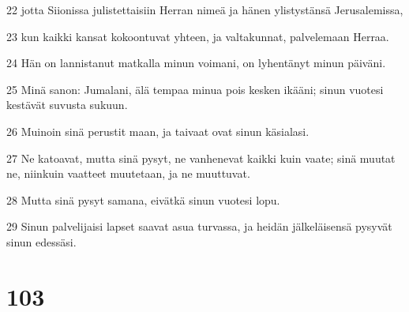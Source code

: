 \par 22 jotta Siionissa julistettaisiin Herran nimeä ja hänen ylistystänsä Jerusalemissa,
\par 23 kun kaikki kansat kokoontuvat yhteen, ja valtakunnat, palvelemaan Herraa.
\par 24 Hän on lannistanut matkalla minun voimani, on lyhentänyt minun päiväni.
\par 25 Minä sanon: Jumalani, älä tempaa minua pois kesken ikääni; sinun vuotesi kestävät suvusta sukuun.
\par 26 Muinoin sinä perustit maan, ja taivaat ovat sinun käsialasi.
\par 27 Ne katoavat, mutta sinä pysyt, ne vanhenevat kaikki kuin vaate; sinä muutat ne, niinkuin vaatteet muutetaan, ja ne muuttuvat.
\par 28 Mutta sinä pysyt samana, eivätkä sinun vuotesi lopu.
\par 29 Sinun palvelijaisi lapset saavat asua turvassa, ja heidän jälkeläisensä pysyvät sinun edessäsi.

\chapter{103}

